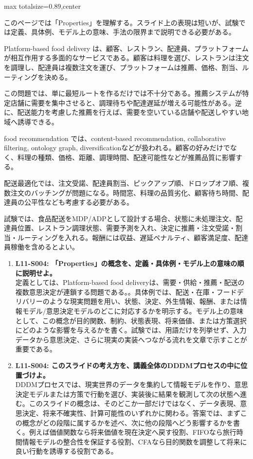 \begin{minipage}[t]{0.58\textwidth}
\begin{adjustbox}{max totalsize={\textwidth}{0.89\textheight},center}
\begin{minipage}{\textwidth}\scriptsize
{}このページでは「Properties」を理解する。スライド上の表現は短いが、試験では定義、具体例、モデル上の意味、手法の限界まで説明できる必要がある。\par
Platform-based food delivery は、顧客、レストラン、配達員、プラットフォームが相互作用する多面的なサービスである。顧客は料理を選び、レストランは注文を調理し、配達員は複数注文を運び、プラットフォームは推薦、価格、割当、ルーティングを決める。\par
この問題では、単に最短ルートを作るだけでは不十分である。推薦システムが特定店舗に需要を集中させると、調理待ちや配達遅延が増える可能性がある。逆に、配送能力を考慮した推薦を行えば、需要を空いている店舗や配送しやすい地域へ誘導できる。\par
food recommendation では、content-based recommendation, collaborative filtering, ontology graph, diversificationなどが扱われる。顧客の好みだけでなく、料理の種類、価格、距離、調理時間、配達可能性などが推薦品質に影響する。\par
配送最適化では、注文受諾、配達員割当、ピックアップ順、ドロップオフ順、複数注文のバッチングが問題になる。時間窓、料理の品質劣化、顧客待ち時間、配達員の公平性なども考慮する必要がある。\par
試験では、食品配送をMDP/ADPとして設計する場合、状態に未処理注文、配達員位置、レストラン調理状態、需要予測を入れ、決定に推薦・注文受諾・割当・ルーティングを入れる。報酬には収益、遅延ペナルティ、顧客満足度、配達員稼働を含めるとよい。\par{}\begin{enumerate}\item \textbf{L11-S004: 「Properties」の概念を、定義・具体例・モデル上の意味の順に説明せよ。}\\定義としては、Platform-based food deliveryは、需要・供給・推薦・配送の複数意思決定が連鎖する問題である。。具体例では、配送・在庫・フードデリバリーのような現実問題を用い、状態、決定、外生情報、報酬、または情報モデル/意思決定モデルのどこに対応するかを明示する。モデル上の意味として、この概念が目的関数、制約、状態表現、将来価値、または方策選択にどのような影響を与えるかを書く。試験では、用語だけを列挙せず、入力データから意思決定、さらに現実の実装へつながる流れを文章で示すことが重要である。\item \textbf{L11-S004: このスライドの考え方を、講義全体のDDDMプロセスの中に位置づけよ。}\\DDDMプロセスでは、現実世界のデータを集約して情報モデルを作り、意思決定モデルまたは方策で行動を選び、実装後に結果を観測して次の状態へ進む。このスライドの概念は、そのどこか一部だけではなく、データ表現、意思決定、将来不確実性、計算可能性のいずれかに関わる。答案では、まずこの概念がどの段階に属するかを述べ、次に他の段階へどう影響するかを書く。例えば価値関数なら将来価値を現在決定へ戻す役割、FIFOなら旅行時間情報モデルの整合性を保証する役割、CFAなら目的関数を調整して将来に良い行動を誘導する役割である。\end{enumerate}

\end{minipage}
\end{adjustbox}
\end{minipage}

